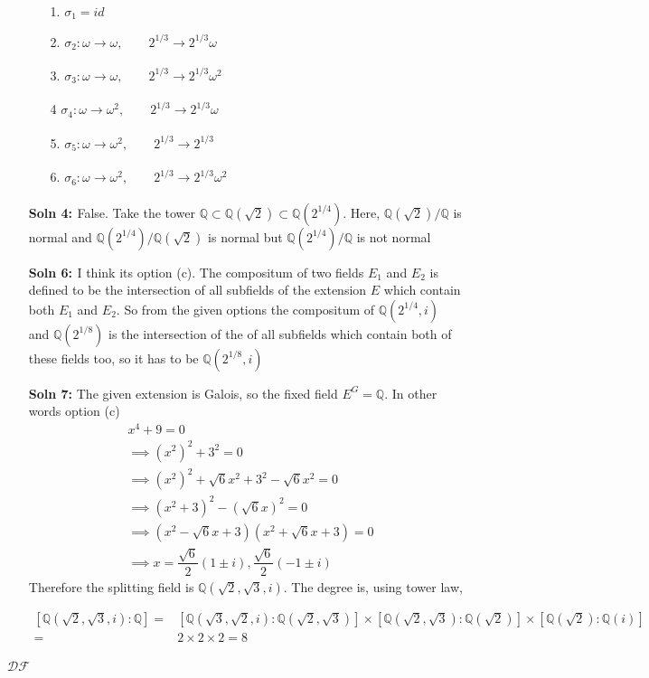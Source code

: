 \documentclass[12pt]{article}
\newcommand{\xmapsto}[2][]{\xrightarrow[#1]{#2}}
\begin{document}
\begin{enumerate}
    \begin{enumerate}
    \item[1. ] $\sigma_1=id$
    \item[2. ] $\sigma_2: \omega \xmapsto{} \omega,\qquad 2^{1/3} \xmapsto{} 2^{1/3}\omega$
    \item[3. ] $\sigma_3: \omega \xmapsto{} \omega,\qquad 2^{1/3} \xmapsto{} 2^{1/3}\omega^2$
    \item[4 ] $\sigma_4: \omega \xmapsto{} \omega^2,\qquad 2^{1/3} \xmapsto{} 2^{1/3}\omega$
    \item[5. ] $\sigma_5: \omega \xmapsto{} \omega^2,\qquad 2^{1/3} \xmapsto{} 2^{1/3}$
    \item[6. ] $\sigma_6: \omega \xmapsto{} \omega^2,\qquad 2^{1/3} \xmapsto{} 2^{1/3}\omega^2$
    \end{enumerate}
    \item[\bf{Soln 4: }] False. Take the tower $\mathbb{Q}\subset\mathbb{Q}(\sqrt2)\subset\mathbb{Q}(2^{1/4})$. Here, $\mathbb{Q}(\sqrt2)/\mathbb{Q}$ is normal and $\mathbb{Q}(2^{1/4})/\mathbb{Q}(\sqrt2)$ is normal but $\mathbb{Q}(2^{1/4})/\mathbb{Q}$ is not normal 
    \item[\bf{Soln 6: }] I think its option (c). The compositum of two fields $E_1$ and $E_2$ is defined to be the intersection of all subfields of the extension $E$ which contain both $E_1$ and $E_2$. So from the given options the compositum of $\mathbb{Q}(2^{1/4},i)$ and $\mathbb{Q}(2^{1/8})$ is the intersection of the of all subfields which contain both of these fields too, so it has to be $\mathbb{Q}(2^{1/8},i)$ 
    \item[\bf{Soln 7:}] The given extension is Galois, so the fixed field $E^G=\mathbb{Q}$. In other words option (c)
    \newpage
    \[
     \begin{aligned}
        &x^4+9=0 \\
        &\implies (x^2)^2+3^2=0 \\
        &\implies (x^2)^2 +\sqrt6x^2+3^2-\sqrt6x^2=0 \\
        &\implies (x^2+3)^2-(\sqrt6x)^2=0\\
        &\implies (x^2-\sqrt6x+3)(x^2+\sqrt6x+3)=0\\
        &\implies x=\dfrac{\sqrt6}{2}(1\pm i), \dfrac{\sqrt6}{2}(-1\pm i)
    \end{aligned}
\]
    Therefore the splitting field is $\mathbb{Q}(\sqrt2,\sqrt3,i)$. The degree is, using tower law,

    \[
    \begin{aligned}
        [\mathbb{Q}(\sqrt2,\sqrt3,i):\mathbb{Q}]=&[\mathbb{Q}(\sqrt3,\sqrt2,i):\mathbb{Q}(\sqrt2,\sqrt3)]\times[\mathbb{Q}(\sqrt2,\sqrt3):\mathbb{Q}(\sqrt2)]\times[\mathbb{Q}(\sqrt2):\mathbb{Q}(i)]\\
        =&2\times2\times2=8
    \end{aligned}
    \]
\end{enumerate}
$\mathcal{DF}$
    
\end{document}
